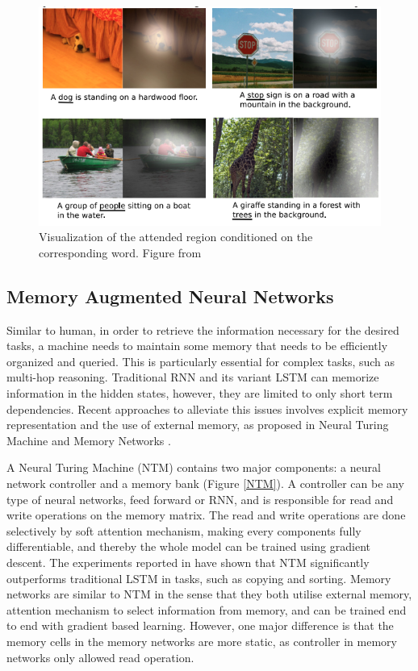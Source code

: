 \documentclass[journal]{IEEEtran}
\begin{document}
\begin{figure}[htb]
  \includegraphics[width=\linewidth]{../attention.png}
  \caption{Visualization of the attended region conditioned on the corresponding word.
  Figure from \cite{xu2015show}}
  \label{attention}
\end{figure}

\subsection{Memory Augmented Neural Networks}
Similar to human, in order to retrieve the information necessary for the desired tasks, a machine needs to maintain some memory that needs to be efficiently organized and queried. 
This is particularly essential for complex tasks, such as multi-hop reasoning. Traditional RNN and its variant LSTM can memorize information in the hidden states,
however, they are limited to only short term dependencies. Recent approaches to alleviate this issues involves explicit memory representation and the use of external memory, 
as proposed in Neural Turing Machine \cite{graves2014neural} and Memory Networks \cite{weston2014memory}.

A Neural Turing Machine (NTM) contains two major components: a neural network controller and a memory bank (Figure \ref{NTM}). 
A controller can be any type of neural networks, feed forward or RNN, and is responsible for read and write operations on the memory matrix.
The read and write operations are done selectively by soft attention mechanism, making every components fully differentiable, 
and thereby the whole model can be trained using gradient descent. The experiments reported in \cite{graves2014neural} have shown that NTM significantly
outperforms traditional LSTM in tasks, such as copying and sorting. Memory networks \cite{graves2014neural} are similar to NTM in the sense that they both utilise external memory, attention mechanism to select information from memory, and
can be trained end to end with gradient based learning. However, one major difference is that the memory cells in the memory networks are more static, 
as controller in memory networks only allowed read operation.
\end{document}
